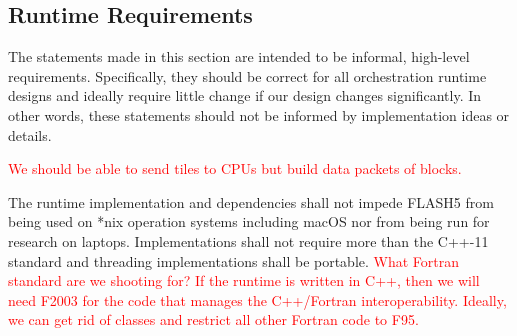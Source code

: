\documentclass{article}
\begin{document}
%
%
%
%

\subsection{Runtime Requirements}
The statements made in this section are intended to be informal, high-level
requirements.  Specifically, they should be correct for all orchestration
runtime designs and ideally require little change if our design changes
significantly.  In other words, these statements should not be informed by
implementation ideas or details.

\begin{req}
\textcolor{red}{We should be able to send tiles to CPUs but build data packets
of blocks.}
\end{req}

\begin{req}
The runtime implementation and dependencies shall not impede FLASH5 from being
used on *nix operation systems including macOS nor from being run for research
on laptops.  Implementations shall not require more than the C++-11 standard and
threading implementations shall be portable.  \textcolor{red}{What Fortran
standard are we shooting for?  If the runtime is written in C++, then we will
need F2003 for the code that manages the C++/Fortran interoperability.  Ideally,
we can get rid of classes and restrict all other Fortran code to F95.}
\end{req}
\end{document}
